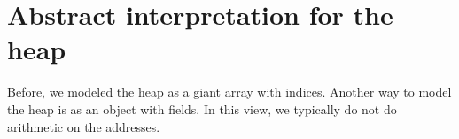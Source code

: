 \documentclass[class=scrartcl]{standalone}
\begin{document}
\section{Abstract interpretation for the heap}
Before, we modeled the heap as a giant array with indices.
Another way to model the heap is as an object with fields.
In this view, we typically do not do arithmetic on the addresses.
\end{document}
